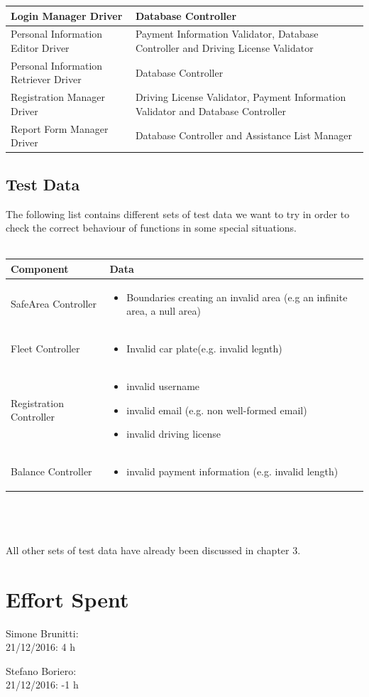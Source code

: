 \documentclass{article}
\begin{document}
\begin{tabular}{ |p{5cm}|p{7cm}| }
 \hline
  Login Manager Driver & Database Controller\\
  \hline
  Personal Information Editor Driver & Payment Information Validator, Database Controller and Driving License Validator\\
  \hline
  Personal Information Retriever Driver & Database Controller\\
  \hline
   Registration Manager Driver & Driving License Validator, Payment Information Validator and Database Controller\\
  \hline
   Report Form Manager Driver & Database Controller and Assistance List Manager\\
   \hline
\end{tabular}
\newpage
\subsection{Test Data}
The following list contains different sets of test data we want to try in order to check the correct behaviour of functions in some special situations. \\\\
\begin{tabular}{ |m{5cm}|m{7cm}| }
  \hline
  \textbf{Component} & \textbf{Data} \\
  \hline
  SafeArea Controller & \begin{itemize}[noitemsep]
\item Boundaries creating an invalid area (e.g an infinite area, a null area)
\end{itemize}\\
  \hline
  Fleet Controller & \begin{itemize}[noitemsep]
\item Invalid car plate(e.g. invalid legnth)
\end{itemize}\\
  \hline
  Registration Controller & \begin{itemize}[noitemsep]
\item invalid username
\item invalid email (e.g. non well-formed email)
\item invalid driving license
\end{itemize}\\
  \hline
  Balance Controller & \begin{itemize}[noitemsep]
\item invalid payment information (e.g. invalid length)
\end{itemize}\\
  \hline
\end{tabular}
\\\\\\
All other sets of test data have already been discussed in chapter 3.
\newpage
\section{Effort Spent}
Simone Brunitti: \\
21/12/2016: 4 h

Stefano Boriero: \\
21/12/2016: -1 h
\end{document}
